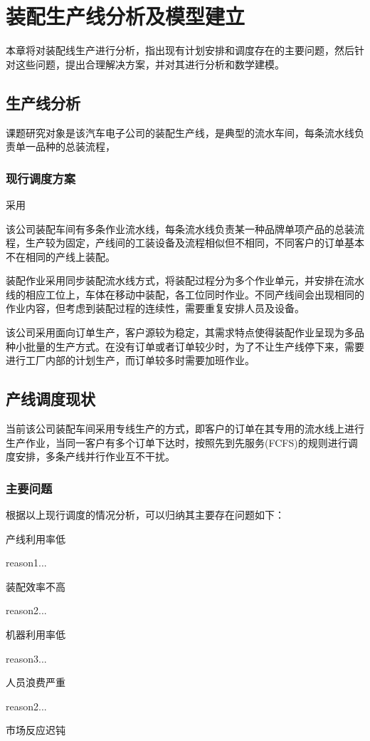 \chapter{装配生产线分析及模型建立}
本章将对装配线生产进行分析，指出现有计划安排和调度存在的主要问题，然后针对这些问题，提出合理解决方案，并对其进行分析和数学建模。
\section{生产线分析}
课题研究对象是该汽车电子公司的装配生产线，是典型的流水车间，每条流水线负责单一品种的总装流程，

\subsection{现行调度方案}
采用

该公司装配车间有多条作业流水线，每条流水线负责某一种品牌单项产品的总装流程，生产较为固定，产线间的工装设备及流程相似但不相同，不同客户的订单基本不在相同的产线上装配。

装配作业采用同步装配流水线方式，将装配过程分为多个作业单元，并安排在流水线的相应工位上，车体在移动中装配，各工位同时作业。不同产线间会出现相同的作业内容，但考虑到装配过程的连续性，需要重复安排人员及设备。

该公司采用面向订单生产，客户源较为稳定，其需求特点使得装配作业呈现为多品种小批量的生产方式。在没有订单或者订单较少时，为了不让生产线停下来，需要进行工厂内部的计划生产，而订单较多时需要加班作业。

\section{产线调度现状}
当前该公司装配车间采用专线生产的方式，即客户的订单在其专用的流水线上进行生产作业，当同一客户有多个订单下达时，按照先到先服务(FCFS)的规则进行调度安排，多条产线并行作业互不干扰。

\subsection{主要问题}
根据以上现行调度的情况分析，可以归纳其主要存在问题如下：
\renewcommand{\labelenumi}{(\theenumi)}
\begin{asparaenum}
\item 产线利用率低

reason1...
\item 装配效率不高

reason2...
\item 机器利用率低

reason3...
\item 人员浪费严重

reason2...
\item 市场反应迟钝
\end{asparaenum}

